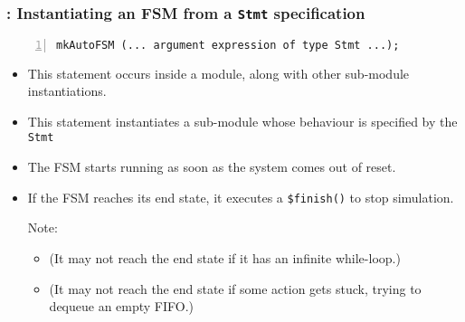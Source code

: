 \begin{frame}[fragile]
\frametitle{{\BSV}: Instantiating an FSM from a {\tt Stmt} specification}

\footnotesize

\begin{Verbatim}[frame=single, numbers=left]
   mkAutoFSM (... argument expression of type Stmt ...);
\end{Verbatim}

\begin{itemize}
        
 \item This statement occurs inside a module, along with other sub-module instantiations.

 \item This statement instantiates a sub-module whose behaviour is specified by the {\tt Stmt}

 \item The FSM starts running as soon as the system comes out of reset.

 \item If the FSM reaches its end state, it executes a {\tt \$finish()} to stop simulation.

       Note:
       \begin{itemize}\footnotesize
        \item (It may not reach the end state if it has an infinite while-loop.)

        \item (It may not reach the end state if some action gets stuck,
              {\eg} trying to dequeue an empty FIFO.)
       \end{itemize}
\end{itemize}

\end{frame}


